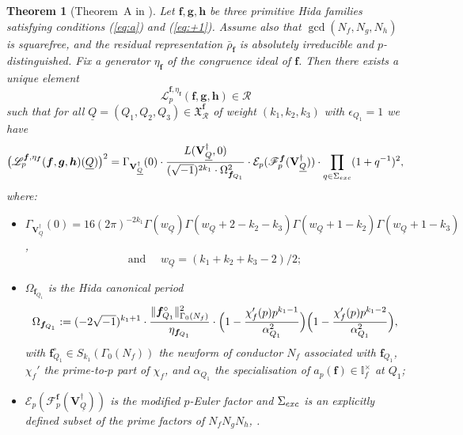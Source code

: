 \documentclass[10pt,letterpaper]{amsart}
\theoremstyle{plain}
\newtheorem{thm}{Theorem}[subsection] %
\theoremstyle{definition}
\theoremstyle{definition}
\theoremstyle{plain}
\theoremstyle{plain}
\theoremstyle{plain}
\theoremstyle{remark}
\numberwithin{equation}{section}
\newcommand{\VQdag}{{\mathbf{V}_{\underline{Q}}^\dagger}}
\newcommand{\cR}{\mathbb{I}}
\newcommand{\bff}{{\boldsymbol{f}}}
\newcommand{\bfg}{{\boldsymbol{g}}}
\newcommand{\bfh}{{\boldsymbol{h}}}
\begin{document}
\begin{thm}[Theorem~A in \cite{hsieh-triple}]\label{thm:hsieh-triple}
Let $\bff,\bfg,\bfh$ be three primitive Hida families %
satisfying conditions (\ref{eq:a}) and (\ref{eq:+1}). Assume also that $\gcd(N_f,N_g,N_h)$ is squarefree,
and the residual representation $\bar{\rho}_{\bff}$ is absolutely irreducible and $p$-distinguished.
Fix a generator $\eta_{\bff}$ of the congruence ideal of $\bff$. Then there exists a unique element 
\[
\mathscr{L}_p^{\bff,\eta_{\bff}}(\bff,\bfg,\bfh)\in\mathcal{R}
\]
such that for all $\underline{Q}=(Q_1,Q_2,Q_3)\in\mathfrak{X}_{\mathcal{R}}^{\bff}$ of weight $(k_1,k_2,k_3)$ with $\epsilon_{Q_1}=1$ we have
\[
\bigl(\mathscr{L}_p^{\bff,\eta_\bff}(\bff,\bfg,\bfh)(\underline{Q})\bigr)^2=\Gamma_{\VQdag}(0)\cdot\frac{L(\VQdag,0)}{(\sqrt{-1})^{2k_1}\cdot\Omega_{\bff_{Q_1}}^2}\cdot\mathcal{E}_p(\mathscr{F}_p^{\bff}(\VQdag))\cdot\prod_{q\in\Sigma_{\rm exc}}(1+q^{-1})^2,
\]
where:
\begin{itemize}
\item $\Gamma_{\VQdag}(0)=16(2\pi)^{-2k_1}\Gamma(w_{\underline{Q}})\Gamma(w_{\underline{Q}}+2-k_2-k_3)\Gamma(w_{\underline{Q}}+1-k_2)\Gamma(w_{\underline{Q}}+1-k_3)$, 
\[
\text{and  }\quad w_{\underline{Q}}=(k_1+k_2+k_3-2)/2;
\] 
\item $\Omega_{\bff_{Q_1}}$ is the Hida canonical period
\[
\Omega_{\bff_{Q_1}}:=(-2\sqrt{-1})^{k_1+1}\cdot\frac{\Vert\bff_{Q_1}^\circ\Vert_{\Gamma_0(N_f)}^2}{\eta_{\bff_{Q_1}}}\cdot\Bigl(1-\frac{\chi_{f}'(p)p^{k_1-1}}{\alpha_{Q_1}^2}\Bigr)\Bigl(1-\frac{\chi_{f}'(p)p^{k_1-2}}{\alpha_{Q_1}^2}\Bigr),
\]
with $\bff_{Q_1}^\circ\in S_{k_1}(\Gamma_0(N_{f}))$ the newform of conductor $N_f$ associated with $\bff_{Q_1}$, $\chi_f'$ the prime-to-$p$ part of $\chi_f$, and $\alpha_{Q_1}$ the specialisation of $a_p(\bff)\in\cR_f^\times$ at $Q_1$;
\item $\mathcal{E}_p(\mathscr{F}_p^{\bff}(\VQdag))$ is the modified $p$-Euler factor
and  $\Sigma_{\rm exc}$ is an explicitly defined subset of the prime factors of $N_f N_g N_h$, \cite[p.~416]{hsieh-triple}.

\end{itemize}

\end{thm}
\end{document}
